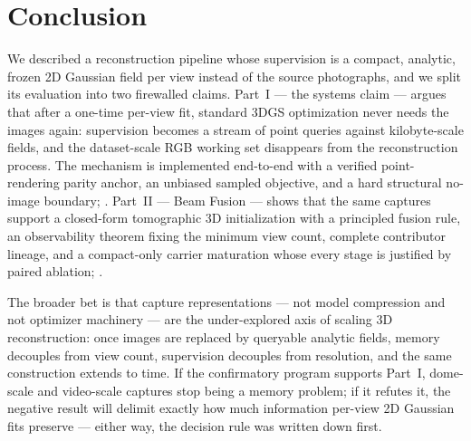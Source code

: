 \section{Conclusion}
\label{sec:conclusion}

We described a reconstruction pipeline whose supervision is a compact, analytic, frozen 2D
Gaussian field per view instead of the source photographs, and we split its evaluation into
two firewalled claims.  Part~I --- the systems claim --- argues that after a one-time
per-view fit, standard 3DGS optimization never needs the images again: supervision becomes a
stream of point queries against kilobyte-scale fields, and the dataset-scale RGB working set
disappears from the reconstruction process.  The mechanism is implemented end-to-end with a
verified point-rendering parity anchor, an unbiased sampled objective, and a hard structural
no-image boundary; .  Part~II --- Beam Fusion --- shows that the same captures support
a closed-form tomographic 3D initialization with a principled fusion rule, an observability
theorem fixing the minimum view count, complete contributor lineage, and a compact-only
carrier maturation whose every stage is justified by paired ablation; .

The broader bet is that capture representations --- not model compression and not optimizer
machinery --- are the under-explored axis of scaling 3D reconstruction: once images are
replaced by queryable analytic fields, memory decouples from view count, supervision
decouples from resolution, and the same construction extends to time.  If the confirmatory
program supports Part~I, dome-scale and video-scale captures stop being a memory problem;
if it refutes it, the negative result will delimit exactly how much information per-view
2D Gaussian fits preserve --- either way, the decision rule was written down first.

